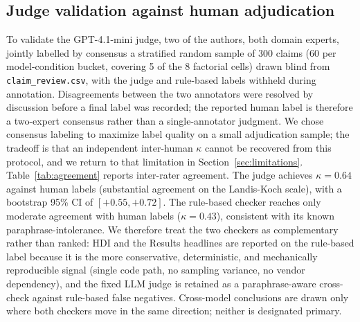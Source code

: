 \documentclass[11pt]{article}
\begin{document}
\subsection{Judge validation against human adjudication}
\label{sec:validation}
To validate the GPT-4.1-mini judge, two of the authors, both domain experts, jointly labelled by consensus a stratified random sample of 300 claims (60 per model-condition bucket, covering 5 of the 8 factorial cells) drawn blind from \texttt{claim\_review.csv}, with the judge and rule-based labels withheld during annotation. Disagreements between the two annotators were resolved by discussion before a final label was recorded; the reported human label is therefore a two-expert consensus rather than a single-annotator judgment. We chose consensus labeling to maximize label quality on a small adjudication sample; the tradeoff is that an independent inter-human $\kappa$ cannot be recovered from this protocol, and we return to that limitation in Section~\ref{sec:limitations}. Table~\ref{tab:agreement} reports inter-rater agreement. The judge achieves $\kappa = 0.64$ against human labels (substantial agreement on the Landis-Koch scale), with a bootstrap 95\% CI of $[+0.55, +0.72]$. The rule-based checker reaches only moderate agreement with human labels ($\kappa = 0.43$), consistent with its known paraphrase-intolerance. We therefore treat the two checkers as complementary rather than ranked: HDI and the Results headlines are reported on the rule-based label because it is the more conservative, deterministic, and mechanically reproducible signal (single code path, no sampling variance, no vendor dependency), and the fixed LLM judge is retained as a paraphrase-aware cross-check against rule-based false negatives. Cross-model conclusions are drawn only where both checkers move in the same direction; neither is designated primary.

\begin{table}[h]
\centering
\small
\setlength{\tabcolsep}{4pt}
\caption{Inter-rater agreement on a stratified 300-claim human adjudication sample ($N=300$, 60 claims per model-condition bucket). $\kappa$ is Cohen's kappa; CIs are 1000-resample bootstrap. Landis-Koch: $\kappa \geq 0.61$ = substantial.}
\label{tab:agreement}
\end{table}
\end{document}
